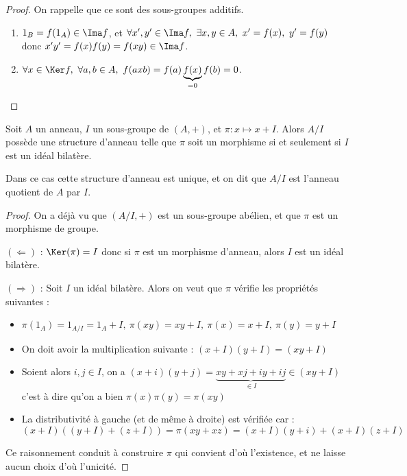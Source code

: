 \begin{proof}
 On rappelle que ce sont des sous-groupes additifs.
\begin{enumerate}
 \item $1_B = f(1_A) \in \Ima f$, et $\forall x',y' \in \Ima f,\ \exists x,y
\in
A,\ x' = f(x),\ y' = f(y)$ donc $x'y' = f(x)f(y) = f(xy) \in \Ima f$.
 \item $\forall x \in \Ker f,\ \forall a,b \in A,\ f(axb) =
f(a)\underbrace{f(x)}_{= 0} f(b) = 0$.
\end{enumerate}
\end{proof}

\begin{prop}
 
Soit $A$ un anneau, $I$ un sous-groupe de $(A,+)$, et $\pi : x \mapsto x + I$.
Alors $A/I$ possède une structure d'anneau telle que $\pi$ soit un morphisme si
et seulement si $I$ est un idéal bilatère.

Dans ce cas cette structure d'anneau est unique, et on dit que $A/I$ est
l'anneau quotient de $A$ par $I$.
\end{prop}

\begin{proof}
On a déjà vu que $(A/I,+)$ est un sous-groupe abélien, et que $\pi$ est un
morphisme de groupe.

$(\Leftarrow)$ : $\Ker(\pi) = I$ donc si $\pi$ est un morphisme d'anneau, alors
$I$ est un idéal bilatère.

$(\Rightarrow)$ : Soit $I$ un idéal bilatère. Alors on veut que $\pi$ vérifie
les propriétés suivantes :
\begin{itemize}
 \item $\pi (1_A) = 1_{A/I} = 1_A +I,\ \pi(xy) = xy +I,\ \pi(x) = x + I,\
\pi(y) = y+I$
 \item On doit avoir la multiplication suivante :
  $(x + I) (y+I)= (xy+I)$
 \item  Soient alors $i,j\in I$, on a $(x+i)(y+j) = \underbrace{xy + xj + iy +
ij}_{\in I} \in (xy + I)$\\ c'est à dire qu'on a bien $\pi(x)\pi(y) = \pi(xy)$
 \item La distributivité à gauche (et de même à droite) est vérifiée car : \\
$(x+I)((y+I)+(z+I)) =
\pi(xy + xz) = (x+I)(y+i) + (x+I)(z+I) $
\end{itemize}
Ce raisonnement conduit à construire $\pi$ qui convient d'où l'existence, et ne
laisse aucun choix d'où l'unicité.
\end{proof}


